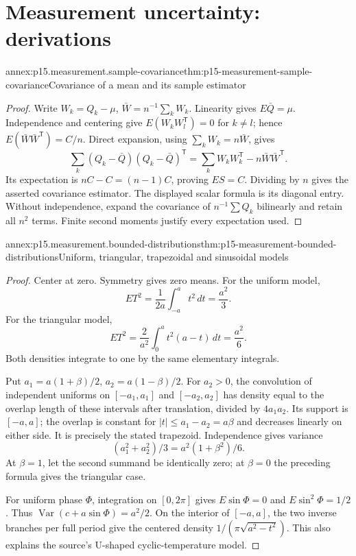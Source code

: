 \section{Measurement uncertainty: derivations}
\label{sec:annex-p15-measurement-uncertainty}

\begin{annexitem}{annex:p15.measurement.sample-covariance}{thm:p15-measurement-sample-covariance}{Covariance of a mean and its sample estimator}
\begin{proof}
Write \(W_k=Q_k-\mu\), \(\bar W=n^{-1}\sum_kW_k\).
Linearity gives \(E\bar Q=\mu\). Independence and centering give
\(E(W_kW_l^{\mathsf T})=0\) for \(k\ne l\); hence
\(E(\bar W\bar W^{\mathsf T})=C/n\).
Direct expansion, using \(\sum_kW_k=n\bar W\), gives
\[
 \sum_k(Q_k-\bar Q)(Q_k-\bar Q)^{\mathsf T}
 =\sum_k W_kW_k^{\mathsf T}-n\bar W\bar W^{\mathsf T}.
\]
Its expectation is \(nC-C=(n-1)C\), proving \(ES=C\).
Dividing by \(n\) gives the asserted covariance estimator. The displayed
scalar formula is its diagonal entry. Without independence, expand the
covariance of \(n^{-1}\sum Q_k\) bilinearly and retain all \(n^2\) terms.
Finite second moments justify every expectation used.
\end{proof}
\end{annexitem}

\begin{annexitem}{annex:p15.measurement.bounded-distributions}{thm:p15-measurement-bounded-distributions}{Uniform, triangular, trapezoidal and sinusoidal models}
\begin{proof}
Center at zero. Symmetry gives zero means. For the uniform model,
\[
 E T^2=\frac1{2a}\int_{-a}^a t^2\,dt=\frac{a^2}{3}.
\]
For the triangular model,
\[
 E T^2=\frac2{a^2}\int_0^a t^2(a-t)\,dt=\frac{a^2}{6}.
\]
Both densities integrate to one by the same elementary integrals.

Put \(a_1=a(1+\beta)/2\), \(a_2=a(1-\beta)/2\). For \(a_2>0\),
the convolution of independent uniforms on \([-a_1,a_1]\) and
\([-a_2,a_2]\) has density equal to the overlap length of these intervals
after translation, divided by \(4a_1a_2\). Its support is \([-a,a]\);
the overlap is constant for \(|t|\leq a_1-a_2=a\beta\) and decreases
linearly on either side. It is precisely the stated trapezoid.
Independence gives variance
\[
 (a_1^2+a_2^2)/3=a^2(1+\beta^2)/6.
\]
At \(\beta=1\), let the second summand be identically zero; at
\(\beta=0\) the preceding formula gives the triangular case.

For uniform phase \(\Phi\), integration on \([0,2\pi]\) gives
\(E\sin\Phi=0\) and \(E\sin^2\Phi=1/2\). Thus
\(\operatorname{Var}(c+a\sin\Phi)=a^2/2\).
On the interior of \([-a,a]\), the two inverse branches per full period
give the centered density \(1/(\pi\sqrt{a^2-t^2})\).
This also explains the source's U-shaped cyclic-temperature model.
\end{proof}
\end{annexitem}

